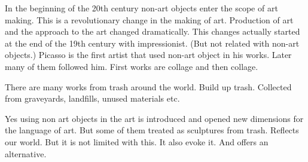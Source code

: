 
In the beginning of the 20th century non-art objects enter the scope of art making. This is a revolutionary change in the making of art. Production of art and the approach to the art changed dramatically. This changes actually started at the end of the 19th century with impressionist. (But not related with non-art objects.) Picasso is the first artist that used non-art object in his works. Later many of them followed him. First works are collage and then collage.  




There are many works from trash around the world. Build up trash. Collected from graveyards, landfills, unused materials etc. 

Yes using non art objects in the art is introduced and opened new dimensions for the language of art. But some of them treated as sculptures from trash. Reflects our world. But it is not limited with this. It also evoke it. And offers an alternative. 










